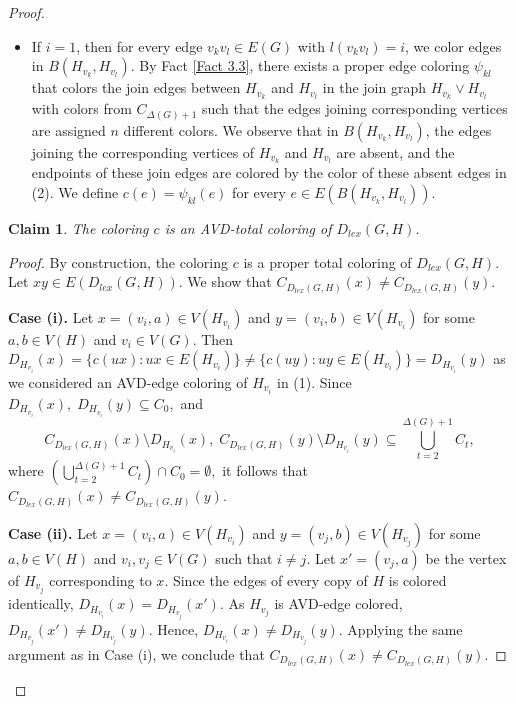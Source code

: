 \documentclass[12pt,reqno,a4paper]{amsart}
\theoremstyle{definition}
\theoremstyle{plain}
\newtheorem{claim}[defn]{Claim}
\begin{document}
\begin{proof}
\begin{enumerate}
\begin{itemize}
        \item If $i=1$, then for every edge $v_kv_l\in E(G)$ with $l(v_kv_l)=i$, we color edges in $B(H_{v_k},H_{v_l})$.
        By Fact \ref{Fact 3.3},  there exists a proper edge  coloring $\psi_{kl}$ that colors the join edges between $H_{v_k}$ and $H_{v_l}$ in the join graph $H_{v_k}\vee H_{v_l}$ with colors from $C_{\Delta(G)+1}$ such that the edges joining corresponding vertices are assigned $n$ different colors.
        We observe that in $B(H_{v_k},H_{v_l})$, the edges joining the corresponding vertices of $H_{v_k}$ and $H_{v_l}$ are absent, and the endpoints of these join edges are colored by the color of these absent edges in (2). We define $c(e)=\psi_{kl}(e)$ for every $e\in E(B(H_{v_k},H_{v_l}))$.
\end{itemize}
\end{enumerate}

\begin{claim}\label{Claim 3.5}
The coloring $c$ is an AVD-total coloring of $D_{lex}(G,H)$.
\end{claim}

\begin{proof}
By construction, the coloring $c$ is a proper total coloring of $D_{lex}(G,H)$. Let $xy\in E(D_{lex}(G, H))$.
We show that $
C_{D_{lex}(G, H)}(x)\neq C_{D_{lex}(G, H)}(y).
$

\textbf{Case (i).}
Let $x=(v_i,a)\in V(H_{v_i})$ and $y=(v_i,b)\in V(H_{v_i})$ for some $a,b\in V(H)$ and $v_{i} \in V(G)$.
Then $D_{H_{v_i}}(x)=\{c(ux):ux\in E(H_{v_i})\}\neq \{c(uy):uy\in E(H_{v_i})\}= D_{H_{v_i}}(y)$ as we considered an AVD-edge coloring of $H_{v_i}$ in (1).
Since
$
D_{H_{v_i}}(x),\; D_{H_{v_i}}(y)\subseteq C_0,
$
and
\[
C_{D_{lex}(G, H)}(x)\setminus D_{H_{v_i}}(x),\;
C_{D_{lex}(G, H)}(y)\setminus D_{H_{v_i}}(y)
\subseteq \bigcup_{t=2}^{\Delta(G)+1} C_t,
\]
where
$
\left(\bigcup_{t=2}^{\Delta(G)+1} C_t\right)\cap C_0=\emptyset,
$
it follows that
$
C_{D_{lex}(G, H)}(x)\neq C_{D_{lex}(G, H)}(y).
$

\textbf{Case (ii).} Let $x=(v_i,a)\in V(H_{v_i})$ and $y=(v_j,b)\in V(H_{v_j})$ for some $a,b\in V(H)$ and $v_i,v_j\in V(G)$ such that $i\neq j$. Let
$
x'=(v_j,a)
$
be the vertex of $H_{v_j}$ corresponding to $x$. Since the edges of every copy of $H$ is colored identically,
$
D_{H_{v_i}}(x)=D_{H_{v_j}}(x').
$
As $H_{v_j}$ is AVD-edge colored,
$
D_{H_{v_j}}(x')\neq D_{H_{v_j}}(y).
$
Hence,
$
D_{H_{v_i}}(x)\neq D_{H_{v_j}}(y).
$
Applying the same argument as in Case (i), we conclude that $C_{D_{lex}(G, H)}(x)\neq C_{D_{lex}(G, H)}(y)$.
\end{proof}
\end{proof}
\end{document}
